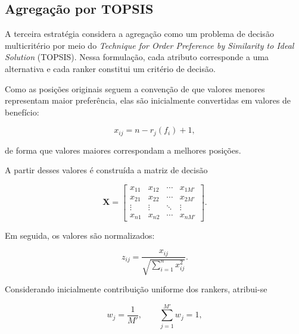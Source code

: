 \subsection{Agregação por TOPSIS}
\label{subsec:ac-efs-topsis}

A terceira estratégia considera a agregação como um problema de decisão
multicritério por meio do \textit{Technique for Order Preference by Similarity
to Ideal Solution} (TOPSIS). Nessa formulação, cada atributo corresponde a uma
alternativa e cada ranker constitui um critério de decisão.

Como as posições originais seguem a convenção de que valores menores
representam maior preferência, elas são inicialmente convertidas em valores de
benefício:

\begin{equation}
    x_{ij}
    =
    n-r_j(f_i)+1,
    \label{eq:topsis-transformacao-ac-efs}
\end{equation}

de forma que valores maiores correspondam a melhores posições.

A partir desses valores é construída a matriz de decisão

\begin{equation}
    \mathbf{X}
    =
    \begin{bmatrix}
        x_{11} & x_{12} & \cdots & x_{1M'} \\
        x_{21} & x_{22} & \cdots & x_{2M'} \\
        \vdots & \vdots & \ddots & \vdots \\
        x_{n1} & x_{n2} & \cdots & x_{nM'}
    \end{bmatrix}.
    \label{eq:topsis-matriz-ac-efs}
\end{equation}

Em seguida, os valores são normalizados:

\begin{equation}
    z_{ij}
    =
    \frac{x_{ij}}
    {\sqrt{\sum_{i=1}^{n}x_{ij}^{2}}}.
    \label{eq:topsis-normalizacao-ac-efs}
\end{equation}

Considerando inicialmente contribuição uniforme dos rankers, atribui-se

\begin{equation}
    w_j=\frac{1}{M'},
    \qquad
    \sum_{j=1}^{M'}w_j=1,
    \label{eq:topsis-pesos-ac-efs}
\end{equation}


